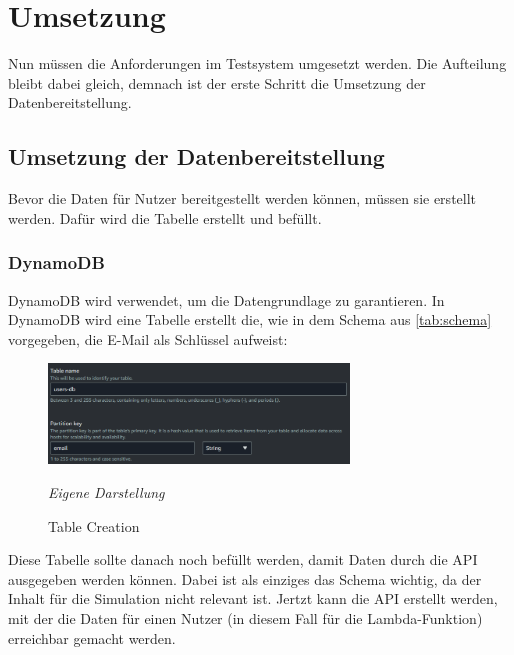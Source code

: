 

\section{Umsetzung}
Nun müssen die Anforderungen im Testsystem umgesetzt werden. Die Aufteilung bleibt dabei gleich, demnach ist der erste Schritt die Umsetzung der Datenbereitstellung.
\subsection{Umsetzung der Datenbereitstellung}
	Bevor die Daten für Nutzer bereitgestellt werden können, müssen sie erstellt werden. Dafür wird die Tabelle erstellt und befüllt.
	\subsubsection{DynamoDB}
	DynamoDB wird verwendet, um die Datengrundlage zu garantieren. In DynamoDB wird eine Tabelle erstellt die, wie in dem Schema aus \ref{tab:schema} vorgegeben, die E-Mail als Schlüssel aufweist:
	\begin{figure}[H]
		\centering
		\begin{minipage}[t]{.7\textwidth} %
		\caption{Table Creation} %
		
		\includegraphics[width = 8cm,keepaspectratio]{tableCreation} \newline
		
		\textit{Eigene Darstellung} %
		\label{fig:tableCreation}
		\end{minipage}
		\end{figure}
	Diese Tabelle sollte danach noch befüllt werden, damit Daten durch die API ausgegeben werden können. Dabei ist als einziges das Schema wichtig, da der Inhalt für die Simulation nicht relevant ist. Jertzt kann die API  erstellt werden, mit der die Daten für einen Nutzer (in diesem Fall für die Lambda-Funktion) erreichbar gemacht werden.
